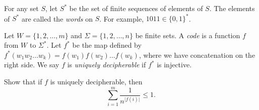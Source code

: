 \documentclass[11pt]{scrartcl}
\begin{document}
\begin{problem}
    For any set $S$, let $S^*$ be the set of finite sequences of elements of $S$. The elements of $S^*$ are called the \emph{words} on $S$. For example, $1011 \in \{0,1\}^*$.

    Let $W = \{1,2,\dots,m\}$ and $\Sigma = \{1,2,\dots,n\}$ be finite sets. A \emph{code} is a function $f$ from $W$ to $\Sigma^*$. Let $f^*$ be the map defined by $f^*(w_1w_2\dots w_k) = f(w_1)f(w_2)\dots f(w_k)$, where we have concatenation on the right side. We say $f$ is \emph{uniquely decipherable} if $f^*$ is injective.

    Show that if $f$ is uniquely decipherable, then
    \[\sum_{i = 1}^m\frac1{n^{\lvert f(i)\rvert}} \le 1.\]
\end{problem}
\end{document}
